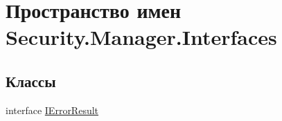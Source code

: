 \hypertarget{namespace_security_1_1_manager_1_1_interfaces}{}\section{Пространство имен Security.\+Manager.\+Interfaces}
\label{namespace_security_1_1_manager_1_1_interfaces}
\subsection*{Классы}
\begin{DoxyCompactItemize}
\item 
interface \hyperlink{interface_security_1_1_manager_1_1_interfaces_1_1_i_error_result}{I\+Error\+Result}
\end{DoxyCompactItemize}
